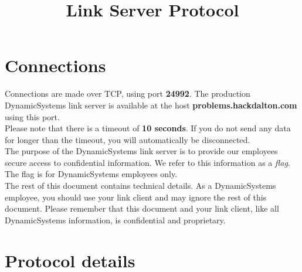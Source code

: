 \documentclass{report}
\title{Link Server Protocol}
\author{\companyName{}}
\date{}
\newcommand{\companyName}{DynamicSystems\texttrademark}
\newcommand{\challengeHost}{problems.hackdalton.com}
\newcommand{\challengePort}{24992}
\begin{document}
\maketitle

\setcounter{tocdepth}{3}
\tableofcontents
\newpage

\chapter{Connections}
Connections are made over TCP, using port \textbf{\challengePort{}}.
The production \companyName{} link server is available at the host \textbf{\challengeHost{}} using this port. \\

Please note that there is a timeout of \textbf{10 seconds}. If you do not send any data for longer than the timeout, you will automatically be disconnected. \\

The purpose of the \companyName{} link server is to provide our employees secure access to confidential information.
We refer to this information as a \emph{flag}. The flag is for \companyName{} employees only. \\

The rest of this document contains technical details.
As a \companyName{} employee, you should use your link client and may ignore the rest of this document.
Please remember that this document and your link client, like all \companyName{} information, is confidential and proprietary.

\chapter{Protocol details}
\end{document}
